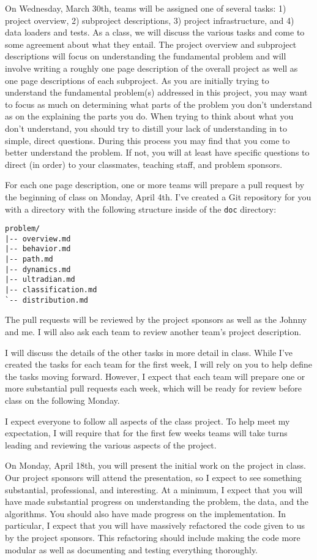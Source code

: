 \documentclass[11pt, oneside]{article}   	%
\begin{document}
On Wednesday, March 30th, teams will be assigned one of several tasks:  1)
project overview, 2) subproject descriptions, 3) project infrastructure, and 4)
data loaders and tests.  As a class, we will discuss the various tasks and come
to some agreement about what they entail.  The project overview and subproject
descriptions will focus on understanding the fundamental problem and will
involve writing a roughly one page description of the overall project as well
as one page descriptions of each subproject.  As you are initially trying to
understand the fundamental problem(s) addressed in this project, you may want
to focus as much on determining what parts of the problem you don't understand
as on the explaining the parts you do.  When trying to think about what you
don't understand, you should try to distill your lack of understanding in to
simple, direct questions.  During this process you may find that you come to
better understand the problem.  If not, you will at least have specific
questions to direct (in order) to your classmates, teaching staff, and problem
sponsors.

For each one page description, one or more teams will prepare a pull request by
the beginning of class on Monday, April 4th.  I've created a Git repository for
you with a directory with the following structure inside of the \texttt{doc}
directory:
\begin{verbatim}
problem/
|-- overview.md
|-- behavior.md
|-- path.md
|-- dynamics.md
|-- ultradian.md
|-- classification.md
`-- distribution.md
\end{verbatim}
The pull requests will be reviewed by the project sponsors as well as the
Johnny and me.  I will also ask each team to review another team's project
description.

I will discuss the details of the other tasks in more detail in class.  While
I've created the tasks for each team for the first week, I will rely on you
to help define the tasks moving forward.  However, I expect that each team
will prepare one or more substantial pull requests each week, which will be
ready for review before class on the following Monday.

I expect everyone to follow all aspects of the class project.  To help
meet my expectation, I will require that for the first few weeks teams
will take turns leading and reviewing the various aspects of the project.

On Monday, April 18th, you will present the initial work on the project in
class.  Our project sponsors will attend the presentation, so I expect to see
something substantial, professional, and interesting.  At a minimum, I expect
that you will have made substantial progress on understanding the problem, the
data, and the algorithms.  You should also have made progress on the
implementation.  In particular, I expect that you will have massively
refactored the code given to us by the project sponsors.  This refactoring
should include making the code more modular as well as documenting and testing
everything thoroughly.
\end{document}
